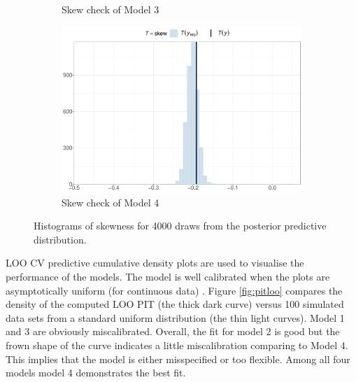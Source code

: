 \documentclass[a4paper]{article}   	%
\begin{document}
\begin{figure}[!htp]
\begin{subfigure}[t]{0.45\textwidth}
			\caption{Skew check of Model 3}
		\end{subfigure}
		\begin{subfigure}[t]{0.45\textwidth}
			\includegraphics[width=\linewidth]{Images/skew_STRand}
			\caption{Skew check of Model 4}
		\end{subfigure}
		\caption{Histograms of skewness for 4000 draws from the posterior predictive distribution.}\label{fig:skewcheck}
	\end{figure}
	
	
	LOO CV predictive cumulative density plots are used to visualise the performance of the models. The model is well calibrated when the plots are asymptotically uniform (for continuous data) \parencite{gabry2019Visualization, Gelman2013Bayesian}. Figure \ref{fig:pitloo} compares the density of the computed LOO PIT (the thick dark curve) versus 100 simulated data sets from a standard uniform distribution (the thin light curves). Model 1 and 3 are obviously miscalibrated. Overall, the fit for model 2 is good but the frown shape of the curve indicates a little miscalibration comparing to Model 4. This implies that the model is either misspecified or too flexible. Among all four models model 4 demonstrates the best fit.
	
\end{document}

